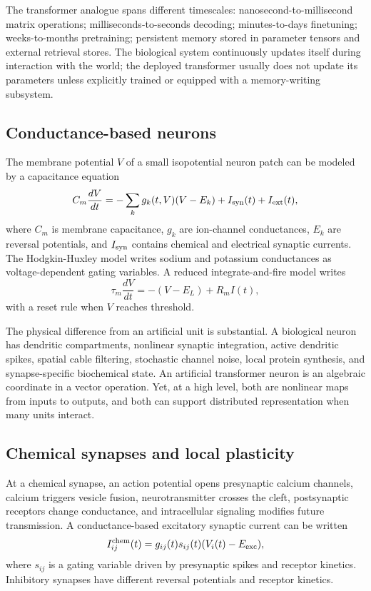 \documentclass[11pt]{article}
\newcommand{\1}{\mathbf{1}}
\begin{document}
The transformer analogue spans different timescales: nanosecond-to-millisecond matrix operations; milliseconds-to-seconds decoding; minutes-to-days finetuning; weeks-to-months pretraining; persistent memory stored in parameter tensors and external retrieval stores. The biological system continuously updates itself during interaction with the world; the deployed transformer usually does not update its parameters unless explicitly trained or equipped with a memory-writing subsystem.

\subsection{Conductance-based neurons}

The membrane potential $V$ of a small isopotential neuron patch can be modeled by a capacitance equation
\[
C_m\frac{dV}{dt}= -\sum_k g_k(t,V)(V-E_k) + I_{\rm syn}(t)+I_{\rm ext}(t),
\]
where $C_m$ is membrane capacitance, $g_k$ are ion-channel conductances, $E_k$ are reversal potentials, and $I_{\rm syn}$ contains chemical and electrical synaptic currents. The Hodgkin-Huxley model writes sodium and potassium conductances as voltage-dependent gating variables. A reduced integrate-and-fire model writes
\[
\tau_m\frac{dV}{dt}=-(V-E_L)+R_m I(t),
\]
with a reset rule when $V$ reaches threshold.

The physical difference from an artificial unit is substantial. A biological neuron has dendritic compartments, nonlinear synaptic integration, active dendritic spikes, spatial cable filtering, stochastic channel noise, local protein synthesis, and synapse-specific biochemical state. An artificial transformer neuron is an algebraic coordinate in a vector operation. Yet, at a high level, both are nonlinear maps from inputs to outputs, and both can support distributed representation when many units interact.

\subsection{Chemical synapses and local plasticity}

At a chemical synapse, an action potential opens presynaptic calcium channels, calcium triggers vesicle fusion, neurotransmitter crosses the cleft, postsynaptic receptors change conductance, and intracellular signaling modifies future transmission. A conductance-based excitatory synaptic current can be written
\[
I_{ij}^{\rm chem}(t)=g_{ij}(t)s_{ij}(t)(V_i(t)-E_{\rm exc}),
\]
where $s_{ij}$ is a gating variable driven by presynaptic spikes and receptor kinetics. Inhibitory synapses have different reversal potentials and receptor kinetics.
\end{document}
